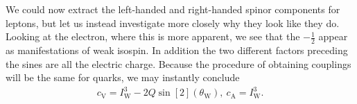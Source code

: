 We could now extract the left-handed and right-handed spinor components for leptons, but let us instead investigate more closely why they look like they do. Looking at the electron, where this is more apparent, we see that the $-\frac{1}{2}$ appear as manifestations of weak isospin. In addition the two different factors preceding the sines are all the electric charge. Because the procedure of obtaining couplings will be the same for quarks, we may instantly conclude
\begin{align*}
	c_{\text{V}} = I_{\text{W}}^{3} - 2Q\sin[2](\theta_{\text{W}}),\ c_{\text{A}} = I_{\text{W}}^{3}.
\end{align*}